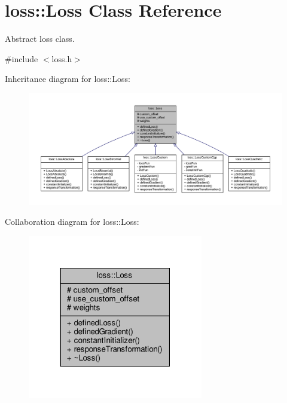 \hypertarget{classloss_1_1_loss}{}\section{loss\+:\+:Loss Class Reference}
\label{classloss_1_1_loss}


Abstract loss class.  




{\ttfamily \#include $<$loss.\+h$>$}



Inheritance diagram for loss\+:\+:Loss\+:
\nopagebreak
\begin{figure}[H]
\begin{center}
\leavevmode
\includegraphics[width=350pt]{classloss_1_1_loss__inherit__graph}
\end{center}
\end{figure}


Collaboration diagram for loss\+:\+:Loss\+:\nopagebreak
\begin{figure}[H]
\begin{center}
\leavevmode
\includegraphics[width=217pt]{classloss_1_1_loss__coll__graph}
\end{center}
\end{figure}
